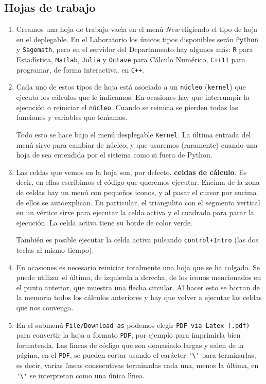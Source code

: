 \subsection{Hojas de trabajo}


\begin{enumerate}
\item Creamos una hoja de trabajo vac\'{\i}a en el men\'u {\itshape New} eligiendo el tipo de hoja en el deplegable. En el Laboratorio los \'unicos tipos disponibles ser\'an {\tt Python} y {\tt Sagemath}, pero en el servidor del Departamento hay algunos m\'as: {\tt R} para Estad\'{\i}stica, {\tt Matlab}, {\tt Julia} y {\tt Octave} para C\'alculo Num\'erico, {\tt C++11} para programar, de forma interactiva, en {\tt C++}.

\item Cada uno de estos tipos de hoja est\'a asociado a un {\tt n\'ucleo} ({\tt kernel}) que ejecuta los c\'alculos que le indicamos. En ocasiones hay que interrumpir la ejecuci\'on o reiniciar el {\tt n\'ucleo}. Cuando se reinicia se pierden todas las funciones y variables que ten\'{\i}amos.

Todo esto se hace bajo el men\'u desplegable {\tt Kernel}. La \'ultima entrada del men\'u sirve para cambiar de n\'ucleo, y que usaremos (raramente) cuando una hoja de {\sage} sea entendida por el sistema como si fuera de Python.  

\item Las celdas que vemos en la hoja son, por defecto, {\bf celdas de c\'alculo}. Es decir, en ellas escribimos el c\'odigo que queremos ejecutar. Encima de la zona de celdas hay un men\'u con peque\~nos iconos, y al pasar el cursor por encima de ellos se autoexplican. En particular, el triangulito con el segmento vertical en un v\'ertice sirve para ejecutar la celda activa y el cuadrado para  parar la ejecuci\'on. La celda activa tiene su borde de color verde. 

Tambi\'en es posible ejecutar la celda activa pulsando {\tt control+Intro} (las dos teclas al mismo tiempo).


\item En ocasiones es necesario reiniciar totalmente una hoja que se ha colgado. Se puede utilizar el \'ultimo, de izquierda a derecha, de los iconos mencionados en el punto anterior,  que muestra una flecha circular. Al hacer esto se borran de la memoria   todos los c\'alculos anteriores y hay que volver a ejecutar las celdas que nos convenga.  

\item En el submen\'u {\tt File/Download as} podemos elegir {\tt PDF via Latex (.pdf)} para convertir la hoja a formato {\tt PDF}, por ejemplo para imprimirla bien formateada. Las l\'{\i}neas de c\'odigo que son demasiado largas y salen de la p\'agina, en el {\tt PDF},  se pueden cortar usando el car\'acter \verb='\'= para terminarlas, es decir, varias l\'{\i}neas consecutivas terminadas cada una, menos la \'ultima, en \verb='\'= se interpretan como una \'unica l\'{\i}nea.   



\end{enumerate}

